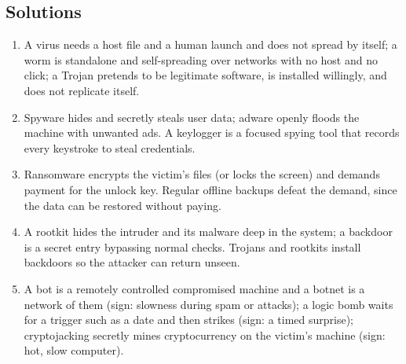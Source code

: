 \documentclass[11pt]{article}
\begin{document}
\subsection*{Solutions}
\begingroup\small
\begin{enumerate}[label=\arabic*.]
  \item A virus needs a host file and a human launch and does not spread by
    itself; a worm is standalone and self-spreading over networks with no
    host and no click; a Trojan pretends to be legitimate software, is
    installed willingly, and does not replicate itself.
  \item Spyware hides and secretly steals user data; adware openly floods
    the machine with unwanted ads. A keylogger is a focused spying tool that
    records every keystroke to steal credentials.
  \item Ransomware encrypts the victim's files (or locks the screen) and
    demands payment for the unlock key. Regular offline backups defeat the
    demand, since the data can be restored without paying.
  \item A rootkit hides the intruder and its malware deep in the system; a
    backdoor is a secret entry bypassing normal checks. Trojans and rootkits
    install backdoors so the attacker can return unseen.
  \item A bot is a remotely controlled compromised machine and a botnet is a
    network of them (sign: slowness during spam or attacks); a logic bomb
    waits for a trigger such as a date and then strikes (sign: a timed
    surprise); cryptojacking secretly mines cryptocurrency on the victim's
    machine (sign: hot, slow computer).
\end{enumerate}
\endgroup
\end{document}
